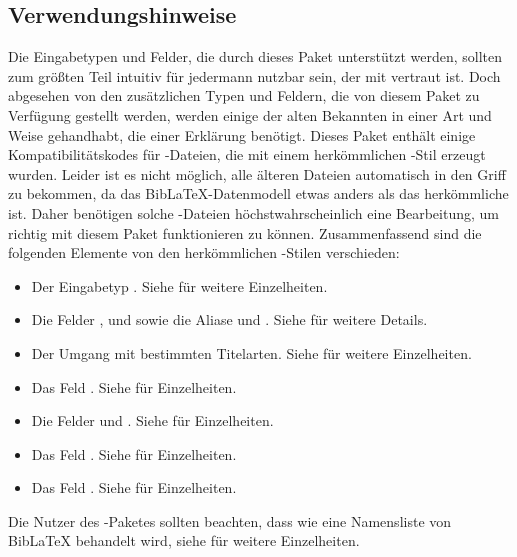 \documentclass{ltxdockit}[2011/03/25]
\newcommand*{\biblatex}{BibLaTeX\xspace}
\begin{document}
\subsection{Verwendungshinweise} \label{bib:use}

Die Eingabetypen und Felder, die durch dieses Paket unterstützt werden, sollten
zum größten Teil intuitiv für jedermann nutzbar sein, der mit \bibtex vertraut
ist. Doch abgesehen von den zusätzlichen Typen und Feldern, die von diesem Paket
zu Verfügung gestellt werden, werden einige der alten Bekannten in einer Art und
Weise gehandhabt, die einer Erklärung benötigt.  Dieses Paket enthält einige
Kompatibilitätskodes für -Dateien, die mit einem herkömmlichen
\bibtex-Stil erzeugt wurden. Leider ist es nicht möglich, alle älteren Dateien
automatisch in den Griff zu bekommen, da das \biblatex-Datenmodell etwas
anders als das herkömmliche \bibtex ist. Daher benötigen solche
-Dateien höchstwahrscheinlich eine Bearbeitung, um richtig mit diesem
Paket funktionieren zu können. Zusammenfassend sind die folgenden Elemente von
den herkömmlichen \bibtex-Stilen verschieden:

\begin{itemize} 
\setlength{\itemsep}{0pt} 
\item Der Eingabetyp .
Siehe  für weitere Einzelheiten.  
\item Die
Felder ,  und 
sowie die Aliase  und . Siehe
 für weitere Details.  
\item Der
Umgang mit bestimmten Titelarten. Siehe  für weitere
Einzelheiten. 
\item Das Feld . Siehe  für Einzelheiten.  
\item Die Felder  und
. Siehe  für
Einzelheiten.  
\item Das Feld . Siehe  für
Einzelheiten.  
\item Das Feld . Siehe  für
Einzelheiten.  
\end{itemize}

Die Nutzer des -Paketes sollten beachten, dass
 wie eine Namensliste von \biblatex behandelt wird,
siehe  für weitere Einzelheiten.
\end{document}
